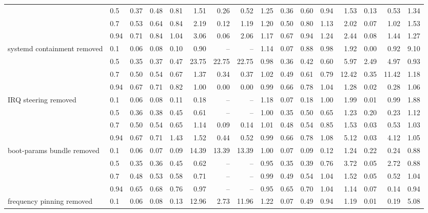 \begin{table}
{\begin{tabular}{llrrrrrrrrrrrrrr}
 & 0.5 & 0.37 & 0.48 & 0.81 & 1.51 & 0.26 & 0.52 & 1.25 & 0.36 & 0.60 & 0.94 & 1.53 & 0.13 & 0.53 & 1.34 \\
 & 0.7 & 0.53 & 0.64 & 0.84 & 2.19 & 0.12 & 1.19 & 1.20 & 0.50 & 0.80 & 1.13 & 2.02 & 0.07 & 1.02 & 1.53 \\
 & 0.94 & 0.71 & 0.84 & 1.04 & 3.06 & 0.06 & 2.06 & 1.17 & 0.67 & 0.94 & 1.24 & 2.44 & 0.08 & 1.44 & 1.27 \\
\cmidrule{1-16}
\multirow[t]{4}{*}{systemd containment removed} & 0.1 & 0.06 & 0.08 & 0.10 & 0.90 & -- & -- & 1.14 & 0.07 & 0.88 & 0.98 & 1.92 & 0.00 & 0.92 & 9.10 \\
 & 0.5 & 0.35 & 0.37 & 0.47 & 23.75 & 22.75 & 22.75 & 0.98 & 0.36 & 0.42 & 0.60 & 5.97 & 2.49 & 4.97 & 0.93 \\
 & 0.7 & 0.50 & 0.54 & 0.67 & 1.37 & 0.34 & 0.37 & 1.02 & 0.49 & 0.61 & 0.79 & 12.42 & 0.35 & 11.42 & 1.18 \\
 & 0.94 & 0.67 & 0.71 & 0.82 & 1.00 & 0.00 & 0.00 & 0.99 & 0.66 & 0.78 & 1.04 & 1.28 & 0.02 & 0.28 & 1.06 \\
\cmidrule{1-16}
\multirow[t]{4}{*}{IRQ steering removed} & 0.1 & 0.06 & 0.08 & 0.11 & 0.18 & -- & -- & 1.18 & 0.07 & 0.18 & 1.00 & 1.99 & 0.01 & 0.99 & 1.88 \\
 & 0.5 & 0.36 & 0.38 & 0.45 & 0.61 & -- & -- & 1.00 & 0.35 & 0.50 & 0.65 & 1.23 & 0.20 & 0.23 & 1.12 \\
 & 0.7 & 0.50 & 0.54 & 0.65 & 1.14 & 0.09 & 0.14 & 1.01 & 0.48 & 0.54 & 0.85 & 1.53 & 0.03 & 0.53 & 1.03 \\
 & 0.94 & 0.67 & 0.71 & 1.43 & 1.52 & 0.44 & 0.52 & 0.99 & 0.66 & 0.78 & 1.08 & 5.12 & 0.03 & 4.12 & 1.05 \\
\cmidrule{1-16}
\multirow[t]{4}{*}{boot-params bundle removed} & 0.1 & 0.06 & 0.07 & 0.09 & 14.39 & 13.39 & 13.39 & 1.00 & 0.07 & 0.09 & 0.12 & 1.24 & 0.22 & 0.24 & 0.88 \\
 & 0.5 & 0.35 & 0.36 & 0.45 & 0.62 & -- & -- & 0.95 & 0.35 & 0.39 & 0.76 & 3.72 & 0.05 & 2.72 & 0.88 \\
 & 0.7 & 0.48 & 0.53 & 0.58 & 0.71 & -- & -- & 0.99 & 0.49 & 0.54 & 1.04 & 1.52 & 0.05 & 0.52 & 1.04 \\
 & 0.94 & 0.65 & 0.68 & 0.76 & 0.97 & -- & -- & 0.95 & 0.65 & 0.70 & 1.04 & 1.14 & 0.07 & 0.14 & 0.94 \\
\cmidrule{1-16}
\multirow[t]{4}{*}{frequency pinning removed} & 0.1 & 0.06 & 0.08 & 0.13 & 12.96 & 2.73 & 11.96 & 1.22 & 0.07 & 0.49 & 0.94 & 1.19 & 0.01 & 0.19 & 5.08 \\

\end{tabular}}
\end{table}
